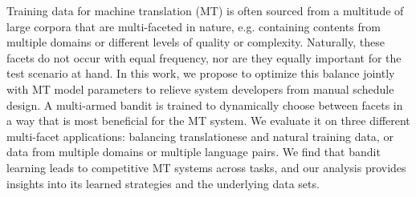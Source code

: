 Training data for machine translation (MT) is often sourced from a multitude of large corpora that are multi-faceted in nature, e.g. containing contents from multiple domains or different levels of quality or complexity. Naturally, these facets do not occur with equal frequency, nor are they equally important for the test scenario at hand. In this work, we propose to optimize this balance jointly with MT model parameters to relieve system developers from manual schedule design. A multi-armed bandit is trained to dynamically choose between facets in a way that is most beneficial for the MT system. We evaluate it on three different multi-facet applications: balancing translationese and natural training data, or data from multiple domains or multiple language pairs. We find that bandit learning leads to competitive MT systems across tasks, and our analysis provides insights into its learned strategies and the underlying data sets.

